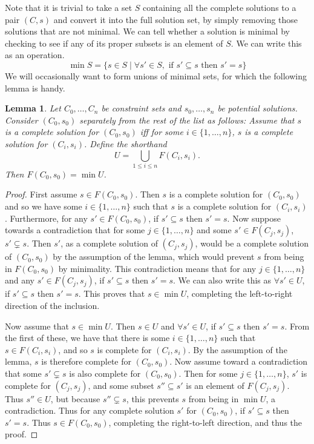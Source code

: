 \documentclass{article}
\newtheorem{lem}{Lemma}
\begin{document}
Note that it is trivial to take a set $S$ containing all the complete solutions to a pair $(C,s)$ and convert it into the full solution set, by simply removing those solutions that are not minimal.  We can tell whether a solution is minimal by checking to see if any of its proper subsets is an element of $S$.  We can write this as an operation.
	$$	\min S = \{ s\in S \mid \forall s'\in S, \text{ if }s'\subseteq s\text{ then } s'=s \}	$$
We will occasionally want to form unions of minimal sets, for which the following lemma is handy.

\begin{lem}\label{L:U}
Let $C_0,\ldots,C_n$ be constraint sets and $s_0,\ldots,s_n$ be potential solutions.  Consider $(C_0,s_0)$ separately from the rest of the list as follows:  Assume that $s$ is a complete solution for $(C_0,s_0)$ iff for some $i\in\{1,\ldots,n\}$, $s$ is a complete solution for $(C_i,s_i)$.  Define the shorthand
	$$	U = \bigcup_{1\leq i\leq n}F(C_i,s_i).	$$
Then $F(C_0,s_0) = \min U$.
\end{lem}

\begin{proof}
First assume $s\in F(C_0,s_0)$.  Then $s$ is a complete solution for $(C_0,s_0)$ and so we have some $i\in\{1,\ldots,n\}$ such that $s$ is a complete solution for $(C_i,s_i)$.  Furthermore, for any $s'\in F(C_0,s_0)$, if $s'\subseteq s$ then $s'=s$.  Now suppose towards a contradiction that for some $j\in\{1,\ldots,n\}$ and some $s'\in F(C_j,s_j)$, $s'\subsetneq s$.  Then $s'$, as a complete solution of $(C_j,s_j)$, would be a complete solution of $(C_0,s_0)$ by the assumption of the lemma, which would prevent $s$ from being in $F(C_0,s_0)$ by minimality.  This contradiction means that for any $j\in\{1,\ldots,n\}$ and any $s'\in F(C_j,s_j)$, if $s'\subseteq s$ then $s'=s$.  We can also write this as $\forall s'\in U$, if $s'\subseteq s$ then $s'=s$.  This proves that $s\in\min U$, completing the left-to-right direction of the inclusion.

Now assume that $s\in\min U$.  Then $s\in U$ and $\forall s'\in U$, if $s'\subseteq s$ then $s'=s$.  From the first of these, we have that there is some $i\in\{1,\ldots,n\}$ such that $s\in F(C_i,s_i)$, and so $s$ is complete for $(C_i,s_i)$.  By the assumption of the lemma, $s$ is therefore complete for $(C_0,s_0)$.  Now assume toward a contradiction that some $s'\subsetneq s$ is also complete for $(C_0,s_0)$.  Then for some $j\in\{1,\ldots,n\}$, $s'$ is complete for $(C_j,s_j)$, and some subset $s''\subseteq s'$ is an element of $F(C_j,s_j)$.  Thus $s''\in U$, but because $s''\subsetneq s$, this prevents $s$ from being in $\min U$, a contradiction.  Thus for any complete solution $s'$ for $(C_0,s_0)$, if $s'\subseteq s$ then $s'=s$.  Thus $s\in F(C_0,s_0)$, completing the right-to-left direction, and thus the proof.
\end{proof}
\end{document}
